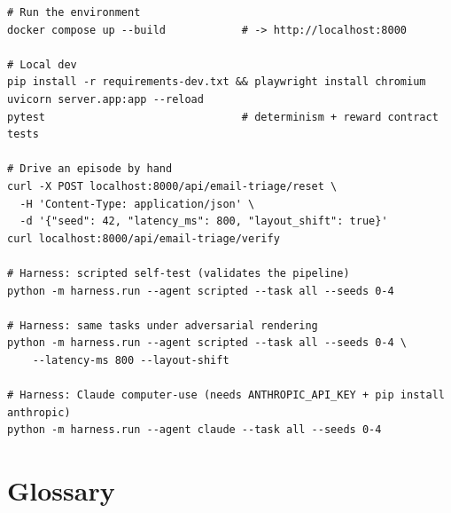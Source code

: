 \documentclass[11pt,openany]{book}
\begin{document}
\begin{lstlisting}[style=sh]
# Run the environment
docker compose up --build            # -> http://localhost:8000

# Local dev
pip install -r requirements-dev.txt && playwright install chromium
uvicorn server.app:app --reload
pytest                               # determinism + reward contract tests

# Drive an episode by hand
curl -X POST localhost:8000/api/email-triage/reset \
  -H 'Content-Type: application/json' \
  -d '{"seed": 42, "latency_ms": 800, "layout_shift": true}'
curl localhost:8000/api/email-triage/verify

# Harness: scripted self-test (validates the pipeline)
python -m harness.run --agent scripted --task all --seeds 0-4

# Harness: same tasks under adversarial rendering
python -m harness.run --agent scripted --task all --seeds 0-4 \
    --latency-ms 800 --layout-shift

# Harness: Claude computer-use (needs ANTHROPIC_API_KEY + pip install anthropic)
python -m harness.run --agent claude --task all --seeds 0-4
\end{lstlisting}

\chapter{Glossary}
\label{app:glossary}
\end{document}
